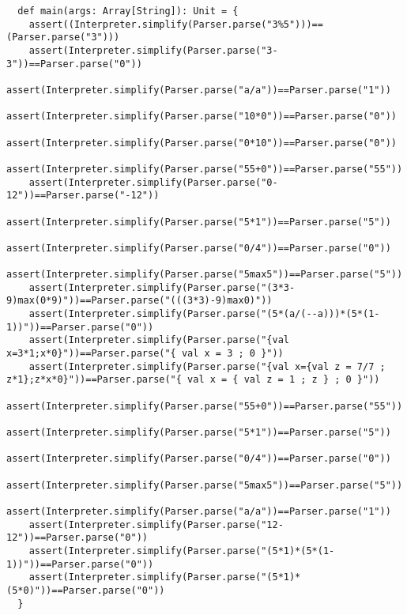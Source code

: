 \documentclass[a1paper, 10pt]{article}
\theoremstyle{remark}
\begin{document}
\begin{lstlisting}
  def main(args: Array[String]): Unit = {
    assert((Interpreter.simplify(Parser.parse("3%5")))==(Parser.parse("3")))
    assert(Interpreter.simplify(Parser.parse("3-3"))==Parser.parse("0"))
    assert(Interpreter.simplify(Parser.parse("a/a"))==Parser.parse("1"))
    assert(Interpreter.simplify(Parser.parse("10*0"))==Parser.parse("0"))
    assert(Interpreter.simplify(Parser.parse("0*10"))==Parser.parse("0"))
    assert(Interpreter.simplify(Parser.parse("55+0"))==Parser.parse("55"))
    assert(Interpreter.simplify(Parser.parse("0-12"))==Parser.parse("-12"))
    assert(Interpreter.simplify(Parser.parse("5*1"))==Parser.parse("5"))
    assert(Interpreter.simplify(Parser.parse("0/4"))==Parser.parse("0"))
    assert(Interpreter.simplify(Parser.parse("5max5"))==Parser.parse("5"))
    assert(Interpreter.simplify(Parser.parse("(3*3-9)max(0*9)"))==Parser.parse("(((3*3)-9)max0)"))
    assert(Interpreter.simplify(Parser.parse("(5*(a/(--a)))*(5*(1-1))"))==Parser.parse("0"))
    assert(Interpreter.simplify(Parser.parse("{val x=3*1;x*0}"))==Parser.parse("{ val x = 3 ; 0 }"))
    assert(Interpreter.simplify(Parser.parse("{val x={val z = 7/7 ; z*1};z*x*0}"))==Parser.parse("{ val x = { val z = 1 ; z } ; 0 }"))
    assert(Interpreter.simplify(Parser.parse("55+0"))==Parser.parse("55"))
    assert(Interpreter.simplify(Parser.parse("5*1"))==Parser.parse("5"))
    assert(Interpreter.simplify(Parser.parse("0/4"))==Parser.parse("0"))
    assert(Interpreter.simplify(Parser.parse("5max5"))==Parser.parse("5"))
    assert(Interpreter.simplify(Parser.parse("a/a"))==Parser.parse("1"))
    assert(Interpreter.simplify(Parser.parse("12-12"))==Parser.parse("0"))
    assert(Interpreter.simplify(Parser.parse("(5*1)*(5*(1-1))"))==Parser.parse("0"))
    assert(Interpreter.simplify(Parser.parse("(5*1)*(5*0)"))==Parser.parse("0"))
  }
\end{lstlisting}
\end{document}
